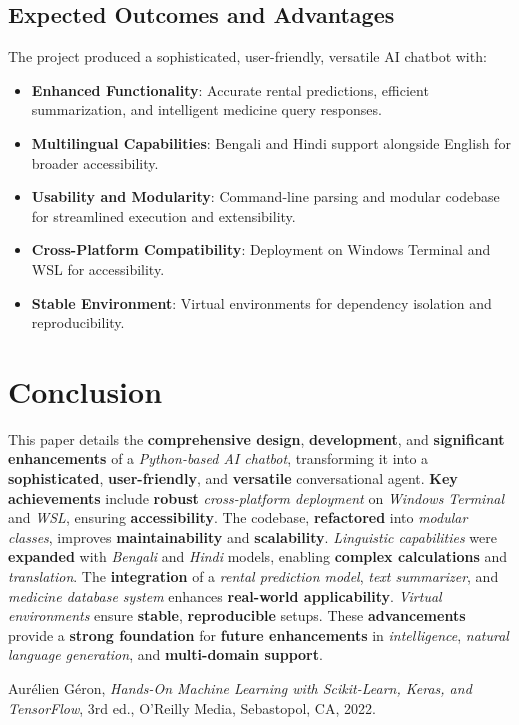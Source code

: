 \documentclass[a4paper,10pt,conference]{IEEEtran}
\begin{document}
\subsection{Expected Outcomes and Advantages}
The project produced a sophisticated, user-friendly, versatile AI chatbot with:
\begin{itemize}
    \item \textbf{Enhanced Functionality}: Accurate rental predictions, efficient summarization, and intelligent medicine query responses.
    \item \textbf{Multilingual Capabilities}: Bengali and Hindi support alongside English for broader accessibility.
    \item \textbf{Usability and Modularity}: Command-line parsing and modular codebase for streamlined execution and extensibility.
    \item \textbf{Cross-Platform Compatibility}: Deployment on Windows Terminal and WSL for accessibility.
    \item \textbf{Stable Environment}: Virtual environments for dependency isolation and reproducibility.
\end{itemize}

\section{Conclusion}
This paper details the \textbf{comprehensive design}, \textbf{development}, and \textbf{significant enhancements} of a \textit{Python-based AI chatbot}, transforming it into a \textbf{sophisticated}, \textbf{user-friendly}, and \textbf{versatile} conversational agent. \textbf{Key achievements} include \textbf{robust} \textit{cross-platform deployment} on \textit{Windows Terminal} and \textit{WSL}, ensuring \textbf{accessibility}. The codebase, \textbf{refactored} into \textit{modular classes}, improves \textbf{maintainability} and \textbf{scalability}. \textit{Linguistic capabilities} were \textbf{expanded} with \textit{Bengali} and \textit{Hindi} models, enabling \textbf{complex calculations} and \textit{translation}. The \textbf{integration} of a \textit{rental prediction model}, \textit{text summarizer}, and \textit{medicine database system} enhances \textbf{real-world applicability}. \textit{Virtual environments} ensure \textbf{stable}, \textbf{reproducible} setups. These \textbf{advancements} provide a \textbf{strong foundation} for \textbf{future enhancements} in \textit{intelligence}, \textit{natural language generation}, and \textbf{multi-domain support}.

\begin{thebibliography}{9}
Aur{\'e}lien G{\'e}ron, \textit{Hands-On Machine Learning with Scikit-Learn, Keras, and TensorFlow}, 3rd ed., O'Reilly Media, Sebastopol, CA, 2022.
\end{thebibliography}
\end{document}
